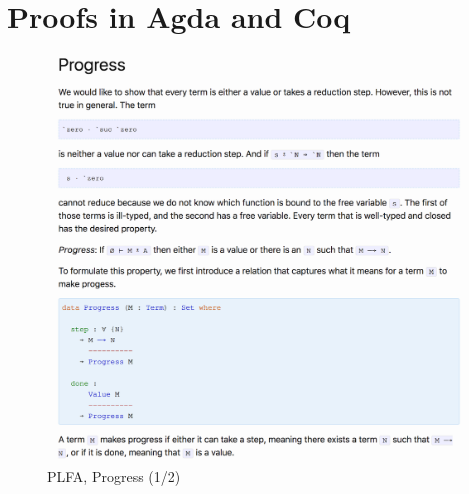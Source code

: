 \documentclass[preprint,authoryear]{elsarticle}
\begin{document}
\section{Proofs in Agda and Coq}

\begin{figure}[t]
  \includegraphics[width=\textwidth]{figures/plfa-progress-1.png}
  \caption{PLFA, Progress (1/2)}
  \label{fig:plfa-progress-1}
\end{figure}  
\end{document}
